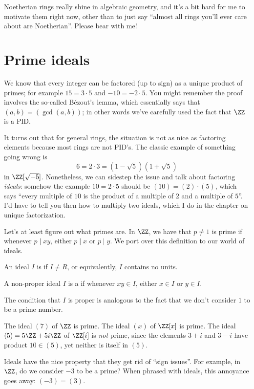 Noetherian rings really shine in algebraic geometry,
and it's a bit hard for me to motivate them right now,
other than to just say ``almost all rings you'll ever care about are Noetherian''.
Please bear with me!

\section{Prime ideals}
We know that every integer can be factored (up to sign)
as a unique product of primes; for example $15 = 3 \cdot 5$
and $-10 = -2 \cdot 5$.
You might remember the proof involves the so-called B\'ezout's lemma,
which essentially says that $(a,b) = (\gcd(a,b))$;
in other words we've carefully used the fact that $\ZZ$ is a PID.

It turns out that for general rings, the situation is not as nice
as factoring elements because most rings are not PID's.
The classic example of something going wrong is
\[ 6 = 2 \cdot 3 = \left( 1-\sqrt5 \right)\left( 1+\sqrt5 \right) \]
in $\ZZ[\sqrt{-5}]$.
Nonetheless, we can sidestep the issue
and talk about factoring \emph{ideals}:
somehow the example $10 = 2 \cdot 5$ should be $(10) = (2) \cdot (5)$,
which says ``every multiple of $10$ is the product of a
multiple of $2$ and a multiple of $5$''.
I'd have to tell you then how to multiply two ideals, which I do
in the chapter on unique factorization.

Let's at least figure out what primes are.
In $\ZZ$, we have that $p \neq 1$ is prime if whenever $p \mid xy$,
either $p \mid x$ or $p \mid y$.
We port over this definition to our world of ideals.
\begin{definition}
	An ideal $I$ is  if $I \neq R$,
	or equivalently, $I$ contains no units.
\end{definition}
\begin{definition}
	A non-proper ideal $I$ is a 
	if whenever $xy \in I$, either $x \in I$ or $y \in I$.
\end{definition}
The condition that $I$ is proper is analogous to the
fact that we don't consider $1$ to be a prime number.

\begin{example}
	\listhack
	\begin{enumerate}[(a)]
		\ii The ideal $(7)$ of $\ZZ$ is prime.
		\ii The ideal $(x)$ of $\ZZ[x]$ is prime.
		\ii The ideal $(5) = 5\ZZ + 5i\ZZ$ of $\ZZ[i]$ is \emph{not} prime, since
		the elements $3+i$ and $3-i$ have product $10 \in (5)$,
		yet neither is itself in $(5)$.
	\end{enumerate}
\end{example}
\begin{remark}
	Ideals have the nice property that they get rid of ``sign issues''.
	For example, in $\ZZ$, do we consider $-3$ to be a prime?
	When phrased with ideals, this annoyance goes away: $(-3) = (3)$.
\end{remark}

